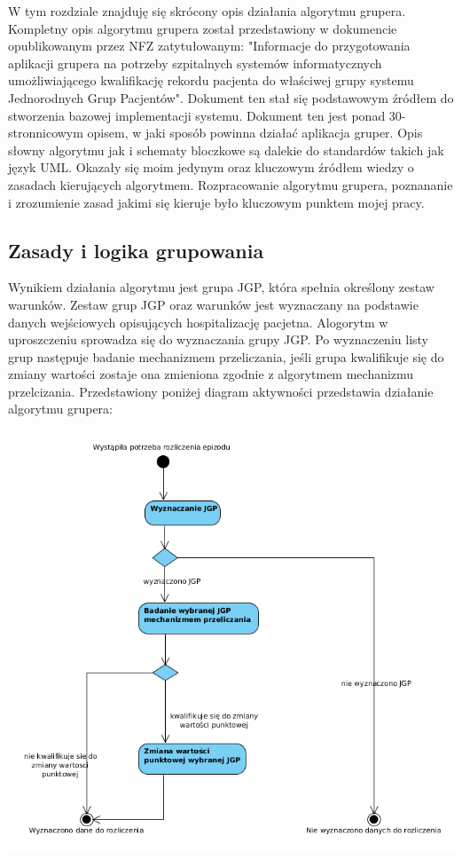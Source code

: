 W tym rozdziale znajduję się skrócony opis działania algorytmu grupera. Kompletny opis algorytmu grupera został przedstawiony w dokumencie opublikowanym przez NFZ zatytułowanym: "Informacje do przygotowania aplikacji grupera na potrzeby szpitalnych systemów informatycznych umożliwiającego kwalifikację rekordu pacjenta do właściwej grupy systemu Jednorodnych Grup Pacjentów". Dokument ten stał się podstawowym źródłem do stworzenia bazowej implementacji systemu. Dokument ten jest ponad 30-stronnicowym opisem, w jaki sposób powinna działać aplikacja gruper. Opis słowny algorytmu jak i schematy bloczkowe są dalekie do standardów takich jak język UML. Okazały się moim jedynym oraz kluczowym źródłem wiedzy o zasadach kierujących algorytmem. Rozpracowanie algorytmu grupera, poznananie i zrozumienie zasad jakimi się kieruje było kluczowym punktem mojej pracy.

\subsection{Zasady i logika grupowania}
\label{sec:zasadyLogikaGrupowania}
Wynikiem działania algorytmu jest grupa JGP, która spełnia określony zestaw warunków. Zestaw grup JGP oraz warunków jest wyznaczany na podstawie danych wejściowych opisujących hospitalizację pacjetna. Alogorytm w uproszczeniu sprowadza się do wyznaczania grupy JGP. Po wyznaczeniu listy grup następuje badanie mechanizmem przeliczania, jeśli grupa kwalifikuje się do zmiany wartości zostaje ona zmieniona zgodnie z algorytmem mechanizmu przelcizania. Przedstawiony poniżej diagram aktywności przedstawia działanie algorytmu grupera:

\includegraphics[scale=0.4]{images/activity-gruper}


